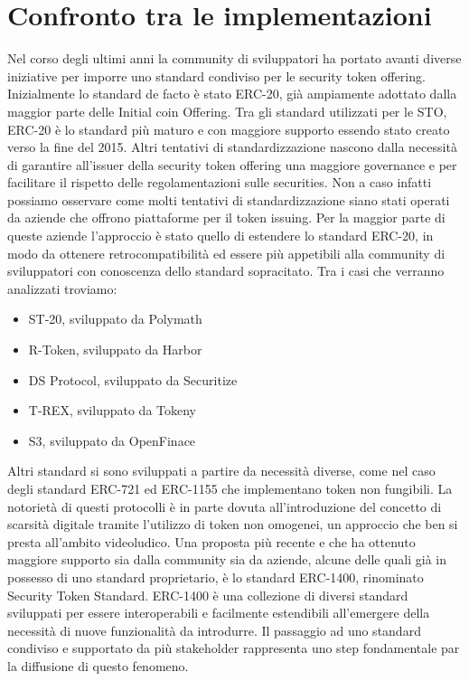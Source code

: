 \chapter{Confronto tra le implementazioni}
Nel corso degli ultimi anni la community di sviluppatori ha portato avanti diverse iniziative per imporre uno standard condiviso per le security token offering. Inizialmente lo standard de facto è stato ERC-20\cite{K37}, già ampiamente adottato dalla maggior parte delle Initial coin Offering. Tra gli standard utilizzati per le STO, ERC-20 è lo standard più maturo e con maggiore supporto essendo stato creato verso la fine del 2015. Altri tentativi di standardizzazione nascono dalla necessità di garantire all'issuer della security token offering una maggiore governance e per facilitare il rispetto delle regolamentazioni sulle securities. Non a caso infatti possiamo osservare come molti tentativi di standardizzazione siano stati operati da aziende che offrono piattaforme per il token issuing. Per la maggior parte di queste aziende l'approccio è stato quello di estendere lo standard ERC-20, in modo da ottenere retrocompatibilità ed essere più appetibili alla community di sviluppatori con conoscenza dello standard sopracitato. Tra i casi che verranno analizzati troviamo: 
\begin{itemize}
    \item ST-20\cite{K38}, sviluppato da Polymath
    \item R-Token\cite{K39}, sviluppato da Harbor
    \item DS Protocol\cite{K41}, sviluppato da Securitize
    \item T-REX\cite{K42}, sviluppato da Tokeny
    \item S3\cite{K43}, sviluppato da OpenFinace
\end{itemize}

Altri standard si sono sviluppati a partire da necessità diverse, come nel caso degli standard ERC-721 ed ERC-1155 che implementano token non fungibili. La notorietà di questi protocolli è in parte dovuta all'introduzione del concetto di scarsità digitale tramite l'utilizzo di token non omogenei, un approccio che ben si presta all'ambito videoludico. 
Una proposta più recente e che ha ottenuto maggiore supporto sia dalla community sia da aziende, alcune delle quali già in possesso di uno standard proprietario, è lo standard ERC-1400, rinominato Security Token Standard\cite{K45}. ERC-1400 è una collezione di diversi standard sviluppati per essere interoperabili e facilmente estendibili all'emergere della necessità di nuove funzionalità da introdurre. Il passaggio ad uno standard condiviso e supportato da più stakeholder rappresenta uno step fondamentale par la diffusione di questo fenomeno.

